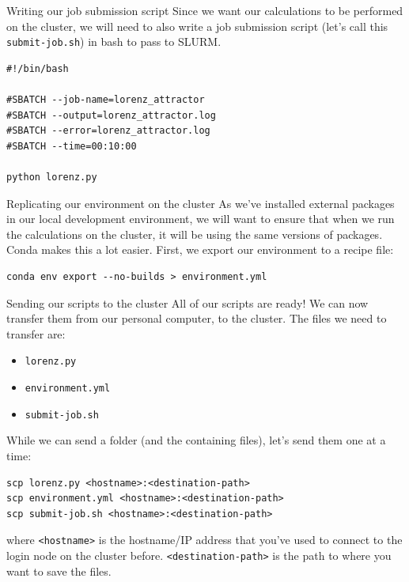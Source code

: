 \documentclass[10pt]{beamer}
\begin{document}
\begin{frame}[label={sec:orgc305d7a},fragile]{Writing our job submission script}
 Since we want our calculations to be performed on the cluster, we will need to
also write a job submission script (let's call this \texttt{submit-job.sh}) in bash to
pass to SLURM.

\begin{verbatim}
#!/bin/bash

#SBATCH --job-name=lorenz_attractor
#SBATCH --output=lorenz_attractor.log
#SBATCH --error=lorenz_attractor.log
#SBATCH --time=00:10:00

python lorenz.py
\end{verbatim}
\end{frame}

\begin{frame}[label={sec:org439e038},fragile]{Replicating our environment on the cluster}
 As we've installed external packages in our local development environment, we
will want to ensure that when we run the calculations on the cluster, it will be
using the same versions of packages. Conda makes this a lot easier. First, we
export our environment to a recipe file:

\begin{verbatim}
conda env export --no-builds > environment.yml
\end{verbatim}
\end{frame}

\begin{frame}[label={sec:org134eeae},fragile]{Sending our scripts to the cluster}
 All of our scripts are ready! We can now transfer them from our personal
computer, to the cluster. The files we need to transfer are:

\begin{itemize}
\item \texttt{lorenz.py}
\item \texttt{environment.yml}
\item \texttt{submit-job.sh}
\end{itemize}

While we can send a folder (and the containing files), let's send them one at a time:

\begin{verbatim}
scp lorenz.py <hostname>:<destination-path>
scp environment.yml <hostname>:<destination-path>
scp submit-job.sh <hostname>:<destination-path>
\end{verbatim}

where \texttt{<hostname>} is the hostname/IP address that you've used to connect to the
login node on the cluster before. \texttt{<destination-path>} is the path to where you
want to save the files.
\end{frame}
\end{document}
